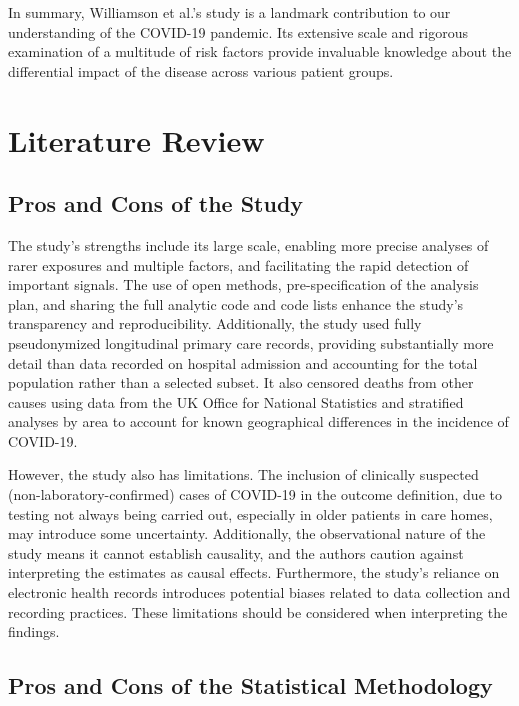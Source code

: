 \documentclass{article}
\begin{document}
In summary, Williamson et al.'s study is a landmark contribution to our understanding of the COVID-19 pandemic. Its extensive scale and rigorous examination of a multitude of risk factors provide invaluable knowledge about the differential impact of the disease across various patient groups.

\section{Literature Review}

\subsection*{Pros and Cons of the Study}

The study's strengths include its large scale, enabling more precise analyses of rarer exposures and multiple factors, and facilitating the rapid detection of important signals. The use of open methods, pre-specification of the analysis plan, and sharing the full analytic code and code lists enhance the study's transparency and reproducibility. Additionally, the study used fully pseudonymized longitudinal primary care records, providing substantially more detail than data recorded on hospital admission and accounting for the total population rather than a selected subset. It also censored deaths from other causes using data from the UK Office for National Statistics and stratified analyses by area to account for known geographical differences in the incidence of COVID-19.

However, the study also has limitations. The inclusion of clinically suspected (non-laboratory-confirmed) cases of COVID-19 in the outcome definition, due to testing not always being carried out, especially in older patients in care homes, may introduce some uncertainty. Additionally, the observational nature of the study means it cannot establish causality, and the authors caution against interpreting the estimates as causal effects. Furthermore, the study's reliance on electronic health records introduces potential biases related to data collection and recording practices. These limitations should be considered when interpreting the findings.

\subsection*{Pros and Cons of the Statistical Methodology}
\end{document}
